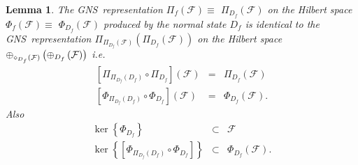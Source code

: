 \documentclass[aps,preprint]{revtex4}
\newtheorem{lemma}[theorem]{Lemma}
\begin{document}
\begin{lemma}
The GNS\ representation $\mathcal{\Pi }_{f}\left( \mathcal{F}\right) \equiv $
$\mathcal{\Pi }_{D_{f}}\left( \mathcal{F}\right) $ on the Hilbert space $%
\mathcal{\Phi }_{f}\left( \mathcal{F}\right) \equiv $ $\mathcal{\Phi }%
_{D_{f}}\left( \mathcal{F}\right) $ produced by the normal state $D_{f}$ is
identical to the GNS\ representation $\mathcal{\Pi }_{\mathcal{\Pi }%
_{D_{f}}\left( \mathcal{F}\right) }\left( \mathcal{\Pi }_{D_{f}}\left( 
\mathcal{F}\right) \right) $ on the Hilbert space $\mathcal{\Phi }_{\mathcal{%
\Pi }_{D_{f}}\left( \mathcal{F}\right) }\left( \mathcal{\Phi }_{D_{f}}\left( 
\mathcal{F}\right) \right) $ i.e.%
\begin{eqnarray}
\left[ \mathcal{\Pi }_{\mathcal{\Pi }_{D_{f}}\left( D_{f}\right) }\circ 
\mathcal{\Pi }_{D_{f}}\right] \left( \mathcal{F}\right) &=&\mathcal{\Pi }%
_{D_{f}}\left( \mathcal{F}\right) \\
\left[ \Phi _{\mathcal{\Pi }_{D_{f}}\left( D_{f}\right) }\circ \mathcal{\Phi 
}_{D_{f}}\right] \left( \mathcal{F}\right) &=&\mathcal{\Phi }_{D_{f}}\left( 
\mathcal{F}\right) .
\end{eqnarray}%
Also 
\begin{eqnarray}
\ker \left\{ \Phi _{D_{f}}\right\} &\subset &\mathcal{F} \\
\ker \left\{ \left[ \Phi _{\mathcal{\Pi }_{D_{f}}\left( D_{f}\right) }\circ 
\mathcal{\Phi }_{D_{f}}\right] \right\} &\subset &\mathcal{\Phi }%
_{D_{f}}\left( \mathcal{F}\right) .
\end{eqnarray}
\end{lemma}
\end{document}
